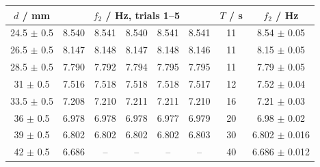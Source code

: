 \begin{tabular}{@{}cccccccc@{}}
\toprule
$d$ / mm & \multicolumn{5}{c}{$f_2$ / Hz, trials 1--5} & $T$ / s & $f_2$ / Hz \\
\midrule
24.5 $\pm$ 0.5 & 8.540 & 8.541 & 8.540 & 8.541 & 8.541 & 11 & 8.54 $\pm$ 0.05 \\
26.5 $\pm$ 0.5 & 8.147 & 8.148 & 8.147 & 8.148 & 8.146 & 11 & 8.15 $\pm$ 0.05 \\
28.5 $\pm$ 0.5 & 7.790 & 7.792 & 7.794 & 7.795 & 7.795 & 11 & 7.79 $\pm$ 0.05 \\
31 $\pm$ 0.5 & 7.516 & 7.518 & 7.518 & 7.518 & 7.517 & 12 & 7.52 $\pm$ 0.04 \\
33.5 $\pm$ 0.5 & 7.208 & 7.210 & 7.211 & 7.211 & 7.210 & 16 & 7.21 $\pm$ 0.03 \\
36 $\pm$ 0.5 & 6.978 & 6.978 & 6.978 & 6.977 & 6.979 & 20 & 6.98 $\pm$ 0.02 \\
39 $\pm$ 0.5 & 6.802 & 6.802 & 6.802 & 6.802 & 6.803 & 30 & 6.802 $\pm$ 0.016 \\
42 $\pm$ 0.5 & 6.686 & -- & -- & -- & -- & 40 & 6.686 $\pm$ 0.012 \\
\bottomrule
\end{tabular}